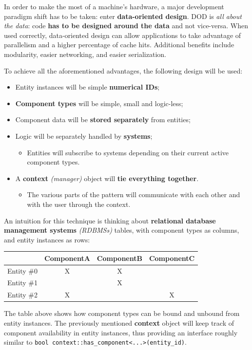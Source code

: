 \documentclass[twoside, 12pt, a4paper, openany]{book}
\providecommand{\tightlist}{%
  \setlength{\itemsep}{0pt}\setlength{\parskip}{0pt}}
\begin{document}
In order to make the most of a machine's hardware, a major development
paradigm shift has to be taken: enter \textbf{data-oriented design}. DOD
is \emph{all about the data}: code \textbf{has to be designed around the
data} and not vice-versa. When used correctly, data-oriented design can
allow applications to take advantage of parallelism and a higher
percentage of cache hits. Additional benefits include modularity, easier
networking, and easier serialization.

To achieve all the aforementioned advantages, the following design will
be used:

\begin{itemize}
\item
  Entity instances will be simple \textbf{numerical IDs};
\item
  \textbf{Component types} will be simple, small and logic-less;
\item
  Component data will be \textbf{stored separately} from entities;
\item
  Logic will be separately handled by \textbf{systems};

  \begin{itemize}
  \tightlist
  \item
    Entities will subscribe to systems depending on their current active
    component types.
  \end{itemize}
\item
  A \textbf{context} \emph{(manager)} object will \textbf{tie everything
  together}.

  \begin{itemize}
  \tightlist
  \item
    The various parts of the pattern will communicate with each other
    and with the user through the context.
  \end{itemize}
\end{itemize}

An intuition for this technique is thinking about \textbf{relational
database management systems} \emph{(RDBMSs)} tables, with component
types as columns, and entity instances as rows:

\begin{longtable}[]{@{}lccc@{}}
\toprule
& ComponentA & ComponentB & ComponentC\tabularnewline
\midrule
\endhead
Entity \#0 & X & X &\tabularnewline
Entity \#1 & & X &\tabularnewline
Entity \#2 & X & & X\tabularnewline
\bottomrule
\end{longtable}

The table above shows how component types can be bound and unbound from
entity instances. The previously mentioned \textbf{context} object will
keep track of component availability in entity instances, thus providing
an interface roughly similar to
\texttt{bool context::has_component<...>(entity_id)}.
\end{document}
